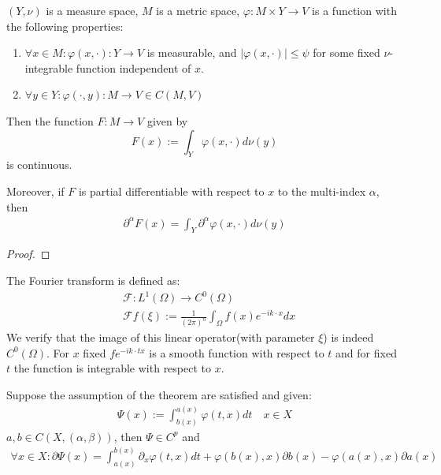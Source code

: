 \begin{theorem}
$(Y, \nu)$ is a measure space, $M$ is a metric space, $\varphi: M \times Y \rightarrow V$ is a function with the following properties:
\begin{enumerate}
	\item $\forall x \in M: \varphi(x, \cdot): Y \rightarrow V$ is measurable, and $|\varphi(x, \cdot)|\leq \psi$ for some fixed $\nu$-integrable function independent of $x$.
	\item $\forall y \in Y: \varphi(\cdot, y): M \rightarrow V \in C(M, V)$
\end{enumerate}
Then the function $F: M \rightarrow V$ given by
\begin{equation*}
	F(x):= \int_Y \varphi(x, \cdot) d\nu(y)
\end{equation*}
is continuous.\par 
Moreover, if $F$ is partial differentiable with respect to $x$ to the multi-index $\alpha$, then
\begin{align*}
	\partial^\alpha F(x) = \int_Y \partial^\alpha \varphi(x, \cdot)d\nu(y)
\end{align*}
\end{theorem}
\begin{proof}
	
\end{proof}
\begin{example}
The Fourier transform is defined as:
\begin{align*}
	&\mathcal{F}: L^1(\Omega) \rightarrow C^0(\Omega)\\
	&\mathcal{F}f (\xi):= \frac{1}{(2\pi)^n}\int_\Omega f(x) e^{-ik\cdot x}dx 
\end{align*}
We verify that the image of this linear operator(with parameter $\xi$) is indeed $C^0(\Omega)$. For $x$ fixed $f e^{-ik\cdot tx}$ is a smooth function with respect to $t$ and for fixed $t$ the function is integrable with respect to $x$. 
\end{example}


\begin{corollary}[cv. Escher p.201]
	Suppose the assumption of the theorem are satisfied and given:
	\begin{align*}
		\Psi(x) := \int^{a(x)}_{b(x)} \varphi(t, x)dt \quad x \in X
	\end{align*}
	$a, b \in C(X, (\alpha, \beta))$, then $\Psi \in C^p$ and 
	\begin{align*}
		\forall x \in X: \partial \Psi(x) 
		= \int_{a(x)}^{b(x)} \partial_x \varphi(t, x)dt + \varphi(b(x), x) \partial b(x) - \varphi(a(x), x) \partial a(x)
	\end{align*}
\end{corollary}

